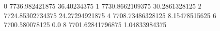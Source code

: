 0 7736.982421875 36.40234375
1 7730.8662109375 30.2861328125
2 7724.85302734375 24.27294921875
4 7708.73486328125 8.15478515625
6 7700.580078125 0.0
8 7701.62841796875 1.04833984375
